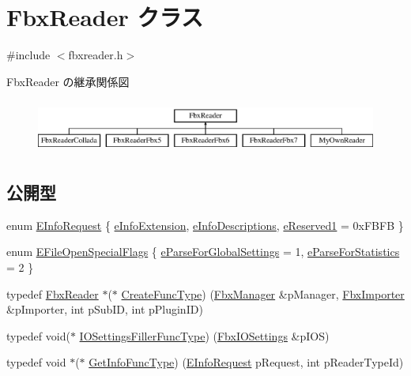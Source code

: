 \hypertarget{class_fbx_reader}{}\section{Fbx\+Reader クラス}
\label{class_fbx_reader}


{\ttfamily \#include $<$fbxreader.\+h$>$}

Fbx\+Reader の継承関係図\begin{figure}[H]
\begin{center}
\leavevmode
\includegraphics[height=1.792000cm]{class_fbx_reader}
\end{center}
\end{figure}
\subsection*{公開型}
\begin{DoxyCompactItemize}
\item 
enum \hyperlink{class_fbx_reader_a33badbb2641958ab0772ec2c06a71e11}{E\+Info\+Request} \{ \hyperlink{class_fbx_reader_a33badbb2641958ab0772ec2c06a71e11a03189cefb5f6d784e3af3760f4c89ebd}{e\+Info\+Extension}, 
\hyperlink{class_fbx_reader_a33badbb2641958ab0772ec2c06a71e11a6bc70d273a72ac7b0ac1ff679da40192}{e\+Info\+Descriptions}, 
\hyperlink{class_fbx_reader_a33badbb2641958ab0772ec2c06a71e11a347956bc041cb7614b8a9be1b388e4c2}{e\+Reserved1} = 0x\+F\+B\+FB
 \}
\item 
enum \hyperlink{class_fbx_reader_a1a14bd907bcda7dd48ba9b0a6236b7b8}{E\+File\+Open\+Special\+Flags} \{ \hyperlink{class_fbx_reader_a1a14bd907bcda7dd48ba9b0a6236b7b8a916239cfabb05bb13e64fab696226011}{e\+Parse\+For\+Global\+Settings} = 1, 
\hyperlink{class_fbx_reader_a1a14bd907bcda7dd48ba9b0a6236b7b8a31ba0d93719d2c2670ef2323447a8041}{e\+Parse\+For\+Statistics} = 2
 \}
\item 
typedef \hyperlink{class_fbx_reader}{Fbx\+Reader} $\ast$($\ast$ \hyperlink{class_fbx_reader_a83acaa910ced3876e5e232ff17f62c45}{Create\+Func\+Type}) (\hyperlink{class_fbx_manager}{Fbx\+Manager} \&p\+Manager, \hyperlink{class_fbx_importer}{Fbx\+Importer} \&p\+Importer, int p\+Sub\+ID, int p\+Plugin\+ID)
\item 
typedef void($\ast$ \hyperlink{class_fbx_reader_aa8d17b6ac89ea7229a3a1510fbccec73}{I\+O\+Settings\+Filler\+Func\+Type}) (\hyperlink{class_fbx_i_o_settings}{Fbx\+I\+O\+Settings} \&p\+I\+OS)
\item 
typedef void $\ast$($\ast$ \hyperlink{class_fbx_reader_a86477804a6ed54e7f99a1887aa50f256}{Get\+Info\+Func\+Type}) (\hyperlink{class_fbx_reader_a33badbb2641958ab0772ec2c06a71e11}{E\+Info\+Request} p\+Request, int p\+Reader\+Type\+Id)
\end{DoxyCompactItemize}
